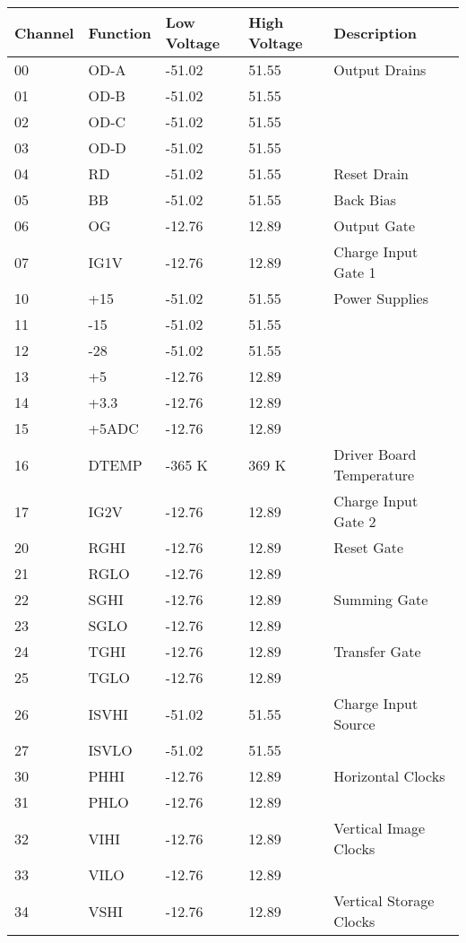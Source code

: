 \begin{table}[h]
\centering
\begin{tabular}{|l|l|l|l|l|}
\hline
Channel & Function & Low Voltage & High Voltage & Description\\
\hline
00 & OD-A & -51.02 & 51.55 & Output Drains \\
01 & OD-B & -51.02 & 51.55 &\\
02 & OD-C & -51.02 & 51.55& \\
03 & OD-D & -51.02 & 51.55& \\
\hline
04 & RD & -51.02 & 51.55 & Reset Drain\\
\hline
05 & BB & -51.02 & 51.55 & Back Bias \\
\hline
06 & OG &  -12.76 & 12.89& Output Gate \\
\hline
07 & IG1V & -12.76 & 12.89& Charge Input Gate 1\\
\hline
10 & +15 & -51.02 & 51.55 & Power Supplies\\
11 & -15 & -51.02 & 51.55 & \\
12 & -28 & -51.02 & 51.55 &\\
13 & +5 & -12.76 & 12.89&\\
14 & +3.3&  -12.76 & 12.89&\\
15 & +5ADC & -12.76 & 12.89& \\
\hline
16 & DTEMP & -365 K & 369 K & Driver Board Temperature\\
\hline
17 & IG2V &  -12.76 & 12.89& Charge Input Gate 2 \\
\hline
20 & RGHI & -12.76 & 12.89& Reset Gate\\
21 & RGLO & -12.76 & 12.89& \\
\hline
22 & SGHI & -12.76 & 12.89& Summing Gate \\
23 & SGLO & -12.76 & 12.89& \\
\hline
24 & TGHI & -12.76 & 12.89& Transfer Gate\\
25 & TGLO & -12.76 & 12.89& \\
\hline
26 & ISVHI & -51.02 & 51.55 & Charge Input Source\\
27 & ISVLO &-51.02 & 51.55& \\
\hline
30 & PHHI & -12.76 & 12.89& Horizontal Clocks\\
31 & PHLO & -12.76 & 12.89&\\
\hline
32 & VIHI & -12.76 & 12.89& Vertical Image Clocks\\
33 & VILO & -12.76 & 12.89&\\
\hline
34 & VSHI & -12.76 & 12.89& Vertical Storage Clocks\\

\end{tabular}
\end{table}

